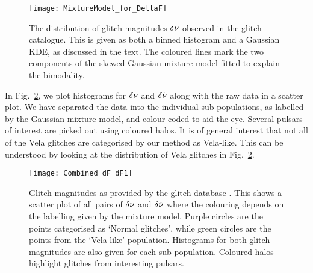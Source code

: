 \documentclass[../full_thesis/full_thesis.tex]{subfiles}
\begin{document}
\begin{figure}[htb]
\centering
\texttt{[image: MixtureModel\_for\_DeltaF]}
\caption{The distribution of glitch magnitudes $\delta\nu$ observed in the
glitch catalogue. This is given as both a binned histogram and a Gaussian
KDE, as discussed in the text. The coloured lines mark the two components of
the skewed Gaussian mixture model fitted to explain the bimodality.}
\label{fig: Delta nu mixture}
\end{figure}

In Fig.~\ref{fig: Espinoza dF dF1}, we plot histograms for $\delta\nu$ and
$\delta\dot{\nu}$ along with the raw data in a scatter plot. We have separated
the data into the individual sub-populations, as labelled by the Gaussian
mixture model, and colour coded to aid the eye. Several pulsars of interest
are picked out using coloured halos. It is of general interest that not all of
the Vela glitches are categorised by our method as Vela-like. This can be understood
by looking at the distribution of Vela glitches in Fig.~\ref{fig: Espinoza dF dF1}.
\begin{figure*}[htb]
\centering
\texttt{[image: Combined\_dF\_dF1]}
\caption{Glitch magnitudes as provided by the glitch-database
         \citep{Espinoza2011}. This shows a scatter plot of all pairs of
         $\delta\nu$ and $\delta\dot{\nu}$ where the colouring depends on the
         labelling given by the mixture model. Purple circles are the
         points categorised as `Normal glitches', while green
         circles are the points from the `Vela-like' population. Histograms for
         both glitch magnitudes are also given for each sub-population.
         Coloured halos highlight glitches from interesting pulsars.}
\label{fig: Espinoza dF dF1}
\end{figure*}

\end{document}

